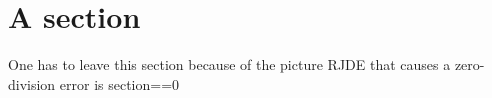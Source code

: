 

\section{A section}

One has to leave this section because of the picture RJDE that causes a zero-division error is section==0 

